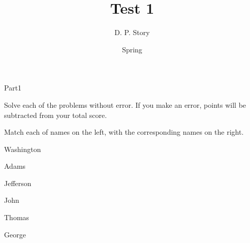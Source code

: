 \documentclass{article}
\title[T1]{Test 1}
\author{D. P. Story}
\date{Spring \the\year}
\begin{document}
\maketitle


\begin{exam}{Part1}

\begin{instructions}
Solve each of the problems without error. If you make an error,
points will be subtracted from your total score.
\end{instructions}


\begin{problem*}[\auto]
Match each of names on the left, with the corresponding names on the right.

\begin{multicols}{2}
\begin{parts}
\item{}\fillin{.5in}{\ref{george}} Washington
\item{}\fillin{.5in}{\ref{john}} Adams
\item{}\fillin{.5in}{\ref{thomas}} Jefferson

\columnbreak

\renewcommand{\thepartno}{\Alph{partno}}



\label{john} John

\item\label{thomas} Thomas

\item\label{george} George

\end{parts}
\end{multicols}
\end{problem*}

\end{exam}
\end{document}
